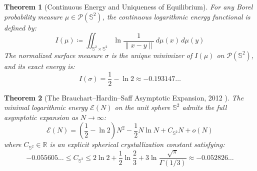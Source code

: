 \documentclass[11pt,a4paper]{article}
\newtheorem{theorem}{Theorem}[section]
\theoremstyle{definition}
\begin{document}
\begin{theorem}[Continuous Energy and Uniqueness of Equilibrium]\label{thm:continuous_energy}
For any Borel probability measure $\mu \in \mathcal{P}(\mathbb{S}^2)$, the continuous logarithmic energy functional is defined by:
\begin{equation}\label{eq:energy_integral}
I(\mu) \coloneqq \iint_{\mathbb{S}^2 \times \mathbb{S}^2} \ln \frac{1}{\|x - y\|} \, d\mu(x) \, d\mu(y)
\end{equation}
The normalized surface measure $\sigma$ is the unique minimizer of $I(\mu)$ on $\mathcal{P}(\mathbb{S}^2)$, and its exact energy is:
\begin{equation}\label{eq:exact_continuous_value}
I(\sigma) = \frac{1}{2} - \ln 2 \approx -0.193147\dots
\end{equation}
\end{theorem}

\begin{theorem}[The Brauchart--Hardin--Saff Asymptotic Expansion, 2012 \cite{brauchart2012}]\label{thm:bhs_asymptotics}
The minimal logarithmic energy $\mathcal{E}(N)$ on the unit sphere $\mathbb{S}^2$ admits the full asymptotic expansion as $N \to \infty$:
\begin{equation}\label{eq:bhs_expansion}
\mathcal{E}(N) = \left( \frac{1}{2} - \ln 2 \right) N^2 - \frac{1}{2} N \ln N + C_{\mathbb{S}^2} N + o(N)
\end{equation}
where $C_{\mathbb{S}^2} \in \mathbb{R}$ is an explicit spherical crystallization constant satisfying:
\begin{equation}\label{eq:crystal_constant}
-0.055605\dots \le C_{\mathbb{S}^2} \le 2 \ln 2 + \frac{1}{2} \ln \frac{2}{3} + 3 \ln \frac{\sqrt{\pi}}{\Gamma(1/3)} \approx -0.052826\dots
\end{equation}
\end{theorem}
\end{document}
